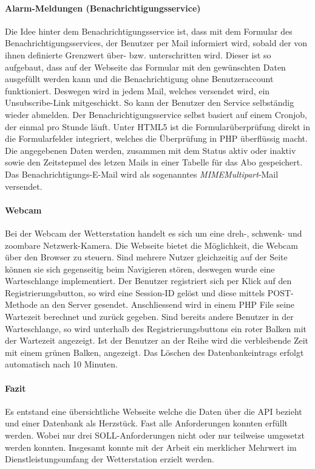 \documentclass[10pt]{article}
\begin{document}
\begin{multicols}{2}
\paragraph{Alarm-Meldungen (Benachrichtigungsservice)}
Die Idee hinter dem Benachrichtigungsservice ist, dass mit dem  Formular des Benachrichtigungsservices, der Benutzer per Mail informiert wird, sobald der von ihnen definierte Grenzwert über- bzw. unterschritten wird.  Dieser ist so aufgebaut, dass auf der Webseite das Formular mit den gewünschten Daten ausgefüllt werden kann und die Benachrichtigung ohne Benutzeraccount funktioniert. Deswegen wird in jedem Mail, welches versendet wird, ein Unsubscribe-Link mitgeschickt. So kann der Benutzer den Service selbständig wieder abmelden. Der Benachrichtigungsservice selbst basiert auf einem Cronjob, der einmal pro Stunde läuft. Unter HTML5 ist die Formularüberprüfung direkt in die Formularfelder integriert, welches die Überprüfung in PHP überflüssig macht. Die angegebenen Daten werden, zusammen mit dem Status aktiv oder inaktiv sowie den Zeitstepmel des letzen Mails in einer Tabelle für das Abo gespeichert. Das Benachrichtigungs-E-Mail wird als sogenanntes \emph{MIMEMultipart}-Mail versendet.

\paragraph{Webcam}
Bei der Webcam der Wetterstation handelt es sich um eine dreh-, schwenk- und zoombare Netzwerk-Kamera. Die Webseite bietet die Möglichkeit, die Webcam über den Browser zu steuern. Sind mehrere Nutzer gleichzeitig auf der Seite können sie sich gegenseitig beim Navigieren stören, deswegen wurde eine Warteschlange implementiert. Der Benutzer registriert sich per Klick auf den Registrierungsbutton, so wird eine Session-ID gelöst und diese mittels POST-Methode an den Server gesendet. Anschliessend wird in einem PHP File seine Wartezeit berechnet und zurück gegeben. Sind bereits andere Benutzer in der Warteschlange, so wird unterhalb des Registrierungsbuttons ein roter Balken mit der Wartezeit angezeigt. Ist der Benutzer an der Reihe wird die verbleibende Zeit mit einem grünen Balken, angezeigt. Das Löschen des Datenbankeintrags erfolgt automatisch nach 10 Minuten.
\paragraph{Fazit}
Es entstand eine übersichtliche Webseite welche die Daten über die API bezieht und einer Datenbank als Herzstück. Fast alle Anforderungen konnten erfüllt werden. Wobei nur drei SOLL-Anforderungen nicht  oder nur teilweise umgesetzt werden konnten. Insgesamt konnte mit der Arbeit ein merklicher Mehrwert im Dienstleistungsumfang der Wetterstation erzielt werden. 
\end{multicols}
 
\end{document}
